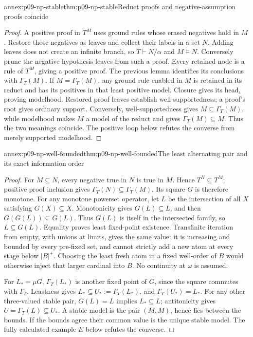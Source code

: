 \begin{annexitem}{annex:p09-np-stable}{thm:p09-np-stable}{Reduct proofs and negative-assumption proofs coincide}
\begin{proof}
A positive proof in \(T^M\) uses ground rules whose erased negatives
hold in \(M\). Restore those negatives as leaves and collect their
labels in a set \(N\). Adding leaves does not create an infinite
branch, so \(T\vdash N/\alpha\) and \(M\models N\).
Conversely prune the negative hypothesis leaves from such a proof.
Every retained node is a rule of \(T^M\), giving a positive proof.
The previous lemma identifies its conclusions with \(\Gamma_T(M)\).
If \(M=\Gamma_T(M)\), any ground rule enabled in \(M\) is
retained in its reduct and has its positives in that least positive
model. Closure gives its head, proving modelhood. Restored proof
leaves establish well-supportedness; a proof's root gives ordinary
support. Conversely, well-supportedness gives
\(M\subseteq\Gamma_T(M)\), while modelhood makes \(M\) a
model of the reduct and gives \(\Gamma_T(M)\subseteq M\).
Thus the two meanings coincide. The positive loop below refutes
the converse from merely supported modelhood.
\end{proof}
\end{annexitem}

\begin{annexitem}{annex:p09-np-well-founded}{thm:p09-np-well-founded}{The least alternating pair and its exact information order}
\begin{proof}
For \(M\subseteq N\), every negative true in \(N\) is true
in \(M\). Hence \(T^N\subseteq T^M\); positive proof
inclusion gives \(\Gamma_T(N)\subseteq\Gamma_T(M)\).
Its square \(G\) is therefore monotone.
For any monotone powerset operator, let \(L\) be the intersection
of all \(X\) satisfying \(G(X)\subseteq X\). Monotonicity
gives \(G(L)\subseteq L\), and then
\(G(G(L))\subseteq G(L)\). Thus \(G(L)\) is itself in
the intersected family, so \(L\subseteq G(L)\). Equality
proves least fixed-point existence. Transfinite iteration from
empty, with unions at limits, gives the same value: it is increasing
and bounded by every pre-fixed set, and cannot strictly add a new
atom at every stage below \(|B|^+\). Choosing the least fresh
atom in a fixed well-order of \(B\) would otherwise inject that
larger cardinal into \(B\). No continuity at \(\omega\) is assumed.

For \(L_*=\mu G\), \(\Gamma_T(L_*)\) is another fixed
point of \(G\), since the square commutes with \(\Gamma_T\).
Leastness gives \(L_*\subseteq U_*:=\Gamma_T(L_*)\), and
\(\Gamma_T(U_*)=L_*\). For any other three-valued stable
pair, \(G(L)=L\) implies \(L_*\subseteq L\); antitonicity
gives \(U=\Gamma_T(L)\subseteq U_*\). A stable model is
the pair \((M,M)\), hence lies between the bounds. If the
bounds agree their common value is the unique stable model.
The fully calculated example \(E\) below refutes the converse.
\end{proof}
\end{annexitem}

